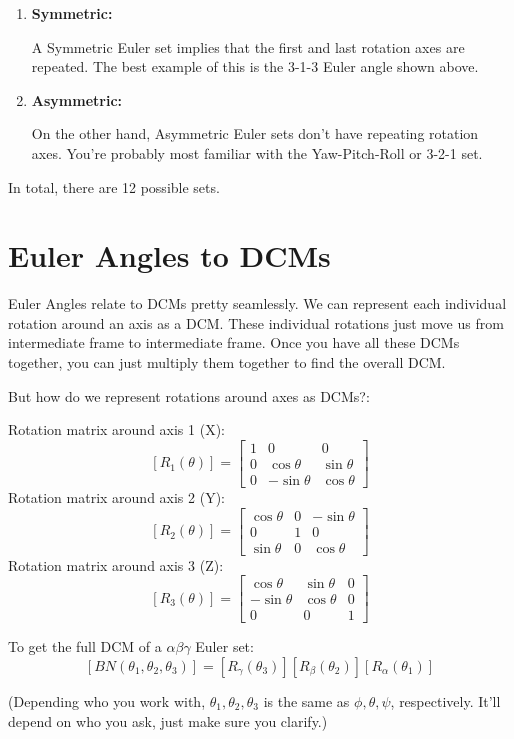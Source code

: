 \documentclass[a4paper,14pt]{extreport}
\begin{document}
\begin{enumerate}
\item{\textbf{Symmetric:}

A Symmetric Euler set implies that the first and last rotation axes are repeated. The best example of this is the 3-1-3 Euler angle shown above.}

\item{\textbf{Asymmetric:}

On the other hand, Asymmetric Euler sets don't have repeating rotation axes. You're probably most familiar with the Yaw-Pitch-Roll or 3-2-1 set.}
\end{enumerate}

In total, there are 12 possible sets.
\section{Euler Angles to DCMs}
Euler Angles relate to DCMs pretty seamlessly. We can represent each individual rotation around an axis as a DCM. These individual rotations just move us from intermediate frame to intermediate frame. Once you have all these DCMs together, you can just multiply them together to find the overall DCM. 

But how do we represent rotations around axes as DCMs?:
\begin{center}
Rotation matrix around axis 1 (X):
\[[R_1(\theta)] = \begin{bmatrix}
			1&0&0\\
			0&\cos{\theta}&\sin{\theta}\\
			0&-\sin{\theta}&\cos{\theta}
	\end{bmatrix}\]	
Rotation matrix around axis 2 (Y):
\[[R_2(\theta)] = \begin{bmatrix}
		\cos{\theta}&0&-\sin{\theta}\\
		0&1&0\\
		\sin{\theta}&0&\cos{\theta}
	\end{bmatrix}\]
Rotation matrix around axis 3 (Z):
\[[R_3(\theta)] = \begin{bmatrix}
		\cos{\theta}&\sin{\theta}&0\\
		-\sin{\theta}&\cos{\theta}&0\\
		0&0&1
	\end{bmatrix}\]

To get the full DCM of a $\alpha\beta\gamma$ Euler set:
\[[BN(\theta_1,\theta_2,\theta_3)] = [R_\gamma(\theta_3)][R_\beta(\theta_2)][R_\alpha(\theta_1)]\]
\end{center}
(Depending who you work with, $\theta_1,\theta_2,\theta_3$ is the same as $\phi,\theta,\psi$, respectively. It'll depend on who you ask, just make sure you clarify.)
\end{document}
